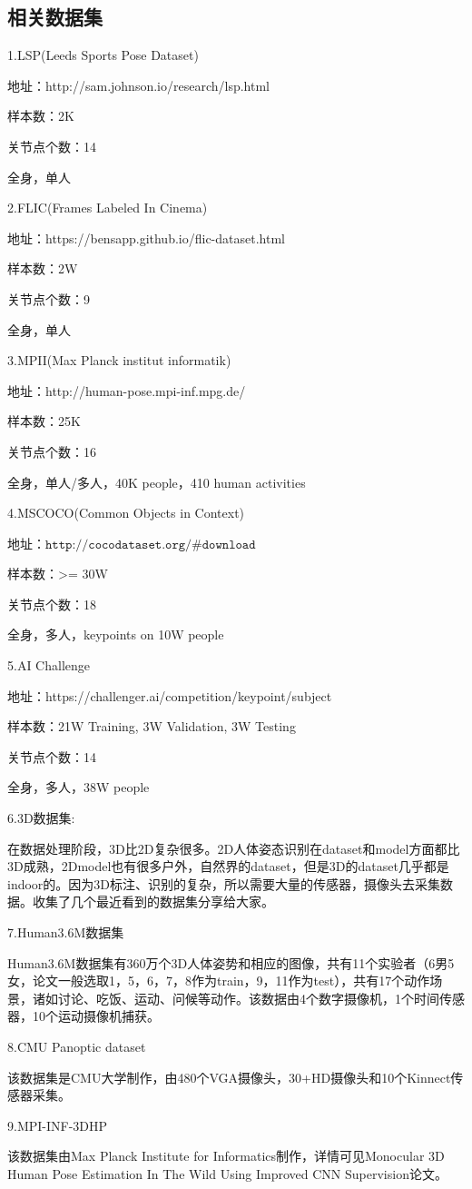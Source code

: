 \documentclass[11pt]{article}
\begin{document}
\subsection{相关数据集}
1.LSP(Leeds Sports Pose Dataset)

地址：http://sam.johnson.io/research/lsp.html

样本数：2K

关节点个数：14

全身，单人

2.FLIC(Frames Labeled In Cinema)

地址：https://bensapp.github.io/flic-dataset.html

样本数：2W

关节点个数：9

全身，单人

3.MPII(Max Planck institut informatik)

地址：http://human-pose.mpi-inf.mpg.de/

样本数：25K

关节点个数：16

全身，单人/多人，40K people，410 human activities

4.MSCOCO(Common Objects in Context)

地址：$\texttt{http://cocodataset.org/\#download}$

样本数：>= 30W

关节点个数：18

全身，多人，keypoints on 10W people

5.AI Challenge

地址：https://challenger.ai/competition/keypoint/subject

样本数：21W Training, 3W Validation, 3W Testing

关节点个数：14

全身，多人，38W people

6.3D数据集:

在数据处理阶段，3D比2D复杂很多。2D人体姿态识别在dataset和model方面都比3D成熟，2Dmodel也有很多户外，自然界的dataset，但是3D的dataset几乎都是indoor的。因为3D标注、识别的复杂，所以需要大量的传感器，摄像头去采集数据。收集了几个最近看到的数据集分享给大家。

7.Human3.6M数据集   

 Human3.6M数据集有360万个3D人体姿势和相应的图像，共有11个实验者（6男5女，论文一般选取1，5，6，7，8作为train，9，11作为test），共有17个动作场景，诸如讨论、吃饭、运动、问候等动作。该数据由4个数字摄像机，1个时间传感器，10个运动摄像机捕获。
 
8.CMU Panoptic dataset

该数据集是CMU大学制作，由480个VGA摄像头，30+HD摄像头和10个Kinnect传感器采集。

9.MPI-INF-3DHP        

该数据集由Max Planck Institute for Informatics制作，详情可见Monocular 3D Human Pose Estimation In The Wild Using Improved CNN Supervision论文。
\end{document}
